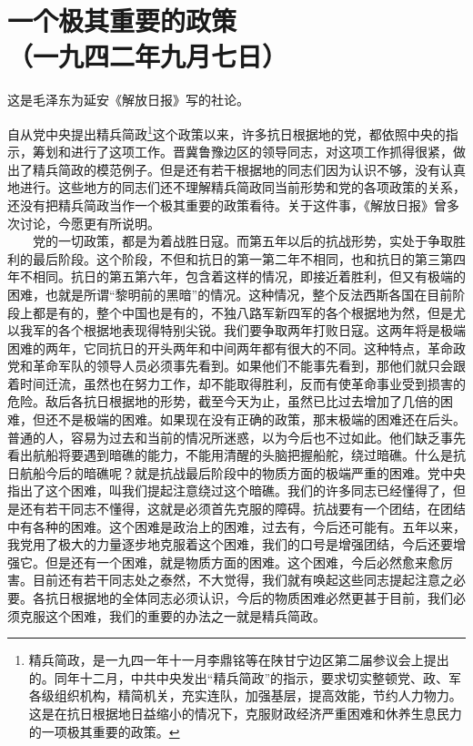 \documentclass[cn,11pt,chinese]{elegantbook}
\def\myformat#1{\hfil\hfil #1}
\begin{document}
\newpage\section*{\myformat{一个极其重要的政策}\\\myformat{（一九四二年九月七日）}}
\begin{introduction}\item  这是毛泽东为延安《解放日报》写的社论。\end{introduction}
自从党中央提出精兵简政\footnote[1]{ 精兵简政，是一九四一年十一月李鼎铭等在陕甘宁边区第二届参议会上提出的。同年十二月，中共中央发出“精兵简政”的指示，要求切实整顿党、政、军各级组织机构，精简机关，充实连队，加强基层，提高效能，节约人力物力。这是在抗日根据地日益缩小的情况下，克服财政经济严重困难和休养生息民力的一项极其重要的政策。}这个政策以来，许多抗日根据地的党，都依照中央的指示，筹划和进行了这项工作。晋冀鲁豫边区的领导同志，对这项工作抓得很紧，做出了精兵简政的模范例子。但是还有若干根据地的同志们因为认识不够，没有认真地进行。这些地方的同志们还不理解精兵简政同当前形势和党的各项政策的关系，还没有把精兵简政当作一个极其重要的政策看待。关于这件事，《解放日报》曾多次讨论，今愿更有所说明。\\
　　党的一切政策，都是为着战胜日寇。而第五年以后的抗战形势，实处于争取胜利的最后阶段。这个阶段，不但和抗日的第一第二年不相同，也和抗日的第三第四年不相同。抗日的第五第六年，包含着这样的情况，即接近着胜利，但又有极端的困难，也就是所谓“黎明前的黑暗”的情况。这种情况，整个反法西斯各国在目前阶段上都是有的，整个中国也是有的，不独八路军新四军的各个根据地为然，但是尤以我军的各个根据地表现得特别尖锐。我们要争取两年打败日寇。这两年将是极端困难的两年，它同抗日的开头两年和中间两年都有很大的不同。这种特点，革命政党和革命军队的领导人员必须事先看到。如果他们不能事先看到，那他们就只会跟着时间迁流，虽然也在努力工作，却不能取得胜利，反而有使革命事业受到损害的危险。敌后各抗日根据地的形势，截至今天为止，虽然已比过去增加了几倍的困难，但还不是极端的困难。如果现在没有正确的政策，那末极端的困难还在后头。普通的人，容易为过去和当前的情况所迷惑，以为今后也不过如此。他们缺乏事先看出航船将要遇到暗礁的能力，不能用清醒的头脑把握船舵，绕过暗礁。什么是抗日航船今后的暗礁呢？就是抗战最后阶段中的物质方面的极端严重的困难。党中央指出了这个困难，叫我们提起注意绕过这个暗礁。我们的许多同志已经懂得了，但是还有若干同志不懂得，这就是必须首先克服的障碍。抗战要有一个团结，在团结中有各种的困难。这个困难是政治上的困难，过去有，今后还可能有。五年以来，我党用了极大的力量逐步地克服着这个困难，我们的口号是增强团结，今后还要增强它。但是还有一个困难，就是物质方面的困难。这个困难，今后必然愈来愈厉害。目前还有若干同志处之泰然，不大觉得，我们就有唤起这些同志提起注意之必要。各抗日根据地的全体同志必须认识，今后的物质困难必然更甚于目前，我们必须克服这个困难，我们的重要的办法之一就是精兵简政。\\
\end{document}
